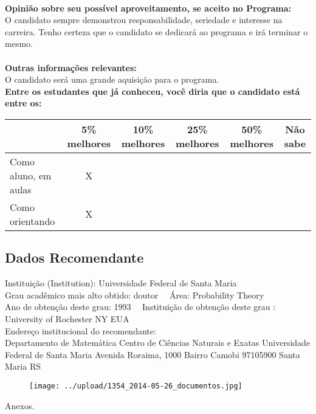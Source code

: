 \documentclass[11pt]{article}
\begin{document}
\\
\textbf{Opinião sobre seu possível aproveitamento, se aceito no Programa:}
\\O candidato sempre demonstrou responsabilidade, seriedade e interesse na carreira. Tenho certeza que o candidato se dedicará ao programa e irá terminar o mesmo.\\ 
\\
\textbf{Outras informações relevantes:} \\O candidato será uma grande aquisição para o programa.
\\[0.3cm]
\textbf{Entre os estudantes que já conheceu, você diria que o candidato está entre os:}
\\
\begin{tabular}{|l|c|c|c|c|c|}
\hline
 & 5\% melhores & 10\% melhores & 25\% melhores & 50\% melhores & Não sabe \\
\hline
Como aluno, em aulas & X &  &  &  & \\
\hline
Como orientando & X &  &  &  & \\
\hline
\end{tabular}
\subsection*{Dados Recomendante} 
	Instituição (Institution): Universidade Federal de Santa Maria
\\ 
	Grau acadêmico mais alto obtido: doutor
	\ \ Área: Probability Theory
	\\
	Ano de obtenção deste grau: 1993
	\ \ 
	Instituição de obtenção deste grau : University of Rochester  NY EUA
	\\ 
	Endereço institucional do recomendante: \\ Departamento de Matemática
Centro de Ciências Naturais e Exatas
Universidade Federal de Santa Maria
Avenida Roraima, 1000
Bairro Camobi
97105900 Santa Maria RS	
\begin{figure}[!htb]
\texttt{[image: ../upload/1354\_2014-05-26\_documentos.jpg]}
\end{figure} 
\begin{center}
Anexos.
\end{center}
\end{document}
